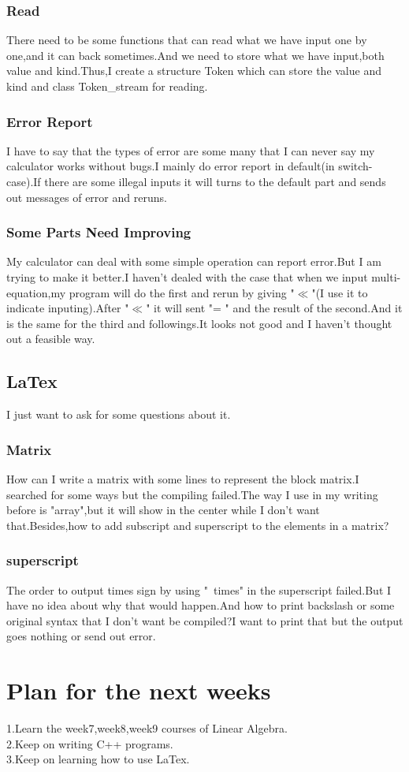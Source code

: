 \documentclass{article}
\begin{document}
\subsubsection{Read}
There need to be some functions that can read what we have input one by one,and it can back sometimes.And we need to store what we have input,both value and kind.Thus,I create a structure Token which can store the value and kind and class Token\_stream for reading.

\subsubsection{Error Report}
I have to say that the types of error are some many that I can never say my calculator works without bugs.I mainly do error report in default(in switch-case).If there are some illegal inputs it will turns to the default part and sends out messages of error and reruns.

\subsubsection{Some Parts Need Improving}
My calculator can deal with some simple operation can report error.But I am trying to make it better.I haven't dealed with the case that when we input multi-equation,my program will do the first and rerun by giving "$\ll$"(I use it to indicate inputing).After "$\ll$" it will sent "= " and the result of the second.And it is the same for the third and followings.It looks not good and I haven't thought out a feasible way.

\subsection{LaTex}
I just want to ask for some questions about it.

\subsubsection{Matrix}
How can I write a matrix with some lines to represent the block matrix.I searched for some ways but the compiling failed.The way I use in my writing before is "array",but it will show in the center while I don't want that.Besides,how to add subscript and superscript to the elements in a matrix?

\subsubsection{superscript}
The order to output times sign by using "\ times" in the superscript failed.But I have no idea about why that would happen.And how to print backslash or some original syntax that I don't want be compiled?I want to print that but the output goes nothing or send out error.

\section{Plan for the next weeks}

1.Learn the week7,week8,week9 courses of Linear Algebra.\\
2.Keep on writing C++ programs.\\
3.Keep on learning how to use LaTex.
\end{document}
